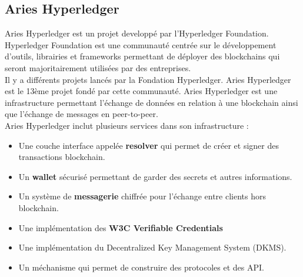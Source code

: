 \documentclass[12pt, openany]{report}
\begin{document}
\subsection{Aries Hyperledger}
\noindent 
\begin{flushleft}
Aries Hyperledger est un projet developpé par l'Hyperledger Foundation. Hyperledger Foundation est une communauté centrée sur le développement d'outils, librairies et frameworks permettant de déployer des blockchains qui seront majoritairement utilisées par des entreprises. \\
Il y a différents projets lancés par la Fondation Hyperledger. Aries Hyperledger est le 13ème projet fondé par cette communauté. Aries Hyperledger est une infrastructure permettant l'échange de données en relation à une blockchain ainsi que l'échange de messages en peer-to-peer. \\
\vspace{2mm}
Aries Hyperledger inclut plusieurs services dans son infrastructure :
\begin{itemize}
\item Une couche interface appelée \textbf{resolver} qui permet de créer et signer des transactions blockchain.
\item Un \textbf{wallet} sécurisé permettant de garder des secrets et autres informations. 
\item Un système de \textbf{messagerie} chiffrée pour l'échange entre clients hors blockchain.
\item Une implémentation des \textbf{W3C Verifiable Credentials} 
\item Une implémentation du Decentralized Key Management System (DKMS).
\item Un méchanisme qui permet de construire des protocoles et des API.


\end{itemize}
\end{flushleft}
\end{document}
